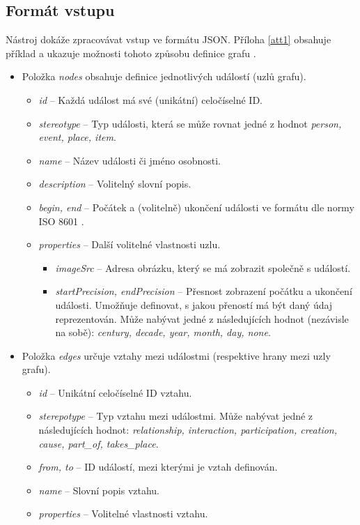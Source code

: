 \subsection{Formát vstupu}
Nástroj dokáže zpracovávat vstup ve formátu JSON. Příloha \ref{att1} obsahuje příklad a ukazuje možnosti tohoto způsobu definice grafu \cite{timeline} \cite{timeline2}.
\begin{itemize}
	\item Položka \textit{nodes} obsahuje definice jednotlivých událostí (uzlů grafu).
	\begin{itemize}
		\item \textit{id} -- Každá událost má své (unikátní) celočíselné ID.
		\item \textit{stereotype} -- Typ události, která se může rovnat jedné z hodnot \textit{person, event, place, item}.
		\item \textit{name} -- Název události či jméno osobnosti.
		\item \textit{description} -- Volitelný slovní popis.
		\item \textit{begin, end} -- Počátek a (volitelně) ukončení události ve formátu dle normy ISO 8601 \cite{dateiso}.
		\item \textit{properties} -- Další volitelné vlastnosti uzlu.
		\begin{itemize}
			\item \textit{imageSrc} -- Adresa obrázku, který se má zobrazit společně s událostí.
			\item \textit{startPrecision, endPrecision} -- Přesnost zobrazení počátku a ukončení události. Umožňuje definovat, s jakou přeností má být daný údaj reprezentován. Může nabývat jedné z následujících hodnot (nezávisle na sobě): \textit{century, decade, year, month, day, none}.
		\end{itemize}
	\end{itemize}
	\item Položka \textit{edges} určuje vztahy mezi událostmi (respektive hrany mezi uzly grafu).
	\begin{itemize}
		\item \textit{id} -- Unikátní celočíselné ID vztahu.
		\item \textit{sterepotype} -- Typ vztahu mezi událostmi. Může nabývat jedné z následujících hodnot: \textit{relationship, interaction, participation, creation, cause, part\_of, takes\_place}.
		\item \textit{from, to} -- ID událostí, mezi kterými je vztah definován.
		\item \textit{name} -- Slovní popis vztahu.
		\item \textit{properties} -- Volitelné vlastnosti vztahu.
	\end{itemize}
\end{itemize}

